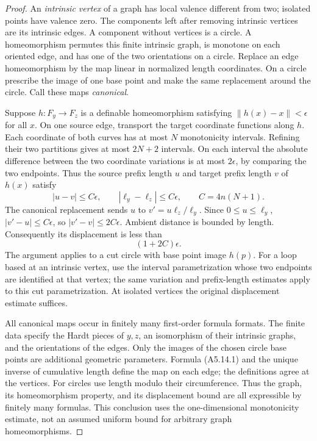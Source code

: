 \begin{proof}
An \emph{intrinsic vertex} of a graph has local valence different
from two; isolated points have valence zero.  The components
left after removing intrinsic vertices are its intrinsic edges.
A component without vertices is a circle.  A homeomorphism
permutes this finite intrinsic graph, is monotone on each
oriented edge, and has one of the two orientations on a circle.
Replace an edge homeomorphism by the map linear in normalized
length coordinates.  On a circle prescribe the image of one
base point and make the same replacement around the circle.
Call these maps \emph{canonical}.

Suppose $h:F_y\to F_z$ is a definable homeomorphism satisfying
$\|h(x)-x\|<\epsilon$ for all $x$.  On one source edge, transport
the target coordinate functions along $h$.  Each coordinate of
both curves has at most $N$ monotonicity intervals.  Refining
their two partitions gives at most $2N+2$ intervals.  On each
interval the absolute difference between the two coordinate
variations is at most $2\epsilon$, by comparing the two
endpoints.  Thus the source prefix length $u$ and target prefix
length $v$ of $h(x)$ satisfy
\[
       |u-v|\leq C\epsilon,
       \qquad |\ell_y-\ell_z|\leq C\epsilon,
       \qquad C=4n(N+1).
 \tag{A5.14.2}
\]
The canonical replacement sends $u$ to
$v'=u\ell_z/\ell_y$.  Since $0\leq u\leq\ell_y$,
$|v'-u|\leq C\epsilon$, so $|v'-v|\leq2C\epsilon$.
Ambient distance is bounded by length.  Consequently its
displacement is less than
\[
                         (1+2C)\epsilon.                 \tag{A5.14.3}
\]
The argument applies to a cut circle with base point image
$h(p)$.  For a loop based at an intrinsic vertex, use the
interval parametrization whose two endpoints are identified
at that vertex; the same variation and prefix-length estimates
apply to this cut parametrization.  At isolated vertices
the original displacement estimate suffices.

All canonical maps occur in finitely many first-order formula
formats.  The finite data specify the Hardt pieces of $y,z$,
an isomorphism of their intrinsic graphs, and the orientations
of the edges.  Only the images of the chosen circle base points
are additional geometric parameters.  Formula (A5.14.1) and
the unique inverse of cumulative length define the map on each
edge; the definitions agree at the vertices.  For circles use
length modulo their circumference.  Thus the graph, its
homeomorphism property, and its displacement bound are all
expressible by finitely many formulas.  This conclusion uses
the one-dimensional monotonicity estimate, not an assumed
uniform bound for arbitrary graph homeomorphisms.


\end{proof}
